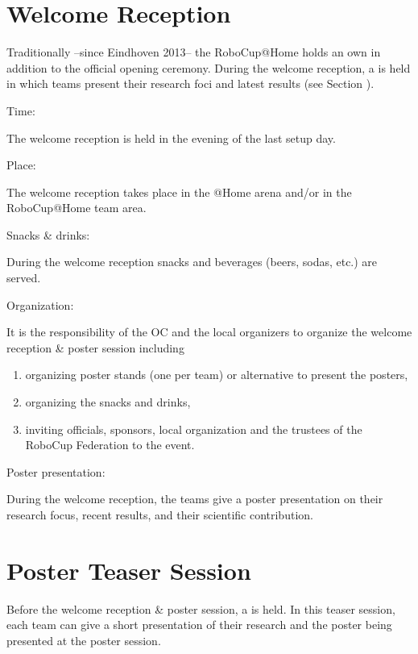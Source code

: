 \section{Welcome Reception}
\label{sec:welcome_reception}
Traditionally --since Eindhoven 2013-- the RoboCup@Home holds an own  in addition to the official opening ceremony. During the welcome reception, a  is held in which teams present their research foci and latest results (see Section ).
\begin{enumerate}
	{\bf\item Time:} The welcome reception is held in the evening of the last setup day.
	{\bf\item Place:} The welcome reception takes place in the @Home arena and/or in the RoboCup@Home team area.
	{\bf\item Snacks \& drinks:} During the welcome reception snacks and beverages (beers, sodas, etc.) are served.
	{\bf\item Organization:} It is the responsibility of the OC and the local organizers to organize the welcome reception \& poster session including
		\begin{enumerate}
			\item organizing poster stands (one per team) or alternative to present the posters,
			\item organizing the snacks and drinks,
			\item inviting officials, sponsors, local organization and the trustees of the RoboCup Federation to the event.
		\end{enumerate}
	{\bf\item Poster presentation:} During the welcome reception, the teams give a poster presentation on their research focus, recent results, and their scientific contribution.
\end{enumerate}

\section{Poster Teaser Session}
\label{sec:poster_teaser_session}
Before the welcome reception \& poster session, a  is held. In this teaser session, each team can give a short presentation of their research and the poster being presented at the poster session.

